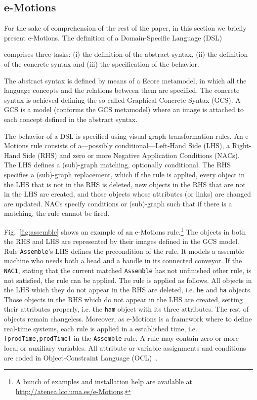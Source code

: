 \documentclass[draft]{llncs}
\newcommand{\mnote}[1]{\marginnote{#1}}
\newcommand{\mnote}[1]{}
\newcommand{\code}[1]{{\texttt{#1}}}
\newcounter{marginalnote}
\renewcommand{\themarginalnote}{\roman{marginalnote}}
\newcommand{\marginnote}[1]
           {\raisebox{1ex}{\scriptsize (\themarginalnote)}%
            \marginpar{\footnotesize\raggedright\indent
                       \raisebox{1ex}{\scriptsize (\themarginalnote)} #1}%
            \addtocounter{marginalnote}{1}}
\begin{document}
\subsection{e-Motions}\label{sub:emotions}
For the sake of comprehension of the rest of the paper, in this section we briefly present e-Motions. The definition of a Domain-Specific Language (DSL)\mnote{hablamos de DSLs en general, no?} comprises three tasks: (i) the definition of the abstract syntax, (ii) the definition of the concrete syntax and (iii) the specification of the behavior.

The abstract syntax is defined by means of a Ecore metamodel, in which all the language concepts and the relations between them are specified. The concrete syntax is achieved defining the so-called Graphical Concrete Syntax (GCS). A GCS is a model (conforms the GCS metamodel) where an image is attached to each concept defined in the abstract syntax.

The behavior of a DSL is specified using visual graph-transformation rules. An e-Motions rule consists of a---possibly conditional---Left-Hand Side (LHS), a Right-Hand Side (RHS) and zero or more Negative Application Conditions (NACs). The LHS defines a (sub)-graph matching, optionally conditional. The RHS specifies a (sub)-graph replacement, which if the rule is applied, every object in the LHS that is not in the RHS is deleted, new objects in the RHS that are not in the LHS are created, and those objects whose attributes (or links) are changed are updated. NACs specify conditions or (sub)-graph such that if there is a matching, the rule cannot be fired.

Fig.~\ref{fig:assemble} shows an example of an e-Motions rule.\footnote{A bunch of examples and installation help are available at \url{http://atenea.lcc.uma.es/e-Motions}.} The objects in both the RHS and LHS are represented by their images defined in the GCS model. Rule \code{Assemble}'s LHS defines the precondition of the rule. It models a assemble machine who needs both a head and a handle in its connected conveyor. If the \code{NAC1}, stating that the current matched \code{Assemble} has not unfinished other rule, is not satisfied, the rule can be applied. The rule is applied as follows. All objects in the LHS which they do not appear in the RHS are deleted, i.e. \code{he} and \code{ha} objects. Those objects in the RHS which do not appear in the LHS are created, setting their attributes properly, i.e. the \code{ham} object with its three attributes. The rest of objects remain changeless. Moreover, as e-Motions is a framework where to define real-time systems, each rule is applied in a established time, i.e. \code{[prodTime,prodTime]} in the \code{Assemble} rule. A rule may contain zero or more local or auxiliary variables. All attribute or variable assignments and conditions are coded in Object-Constraint Language (OCL)~\cite{ocl}.
\end{document}
